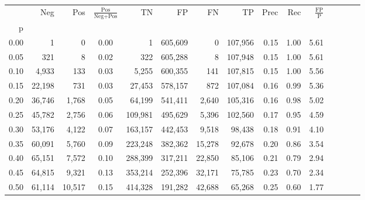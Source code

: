 \begin{tabular}{rrrcrrrrrrrrrrr}
\toprule
{} &     Neg &     Pos & $\frac{\text{Pos}}{\text{Neg}+\text{Pos}}$ &       TN &       FP &       FN &       TP &  Prec &   Rec & $\frac{\text{FP}}{\text{P}}$ \\
p    &         &         &                                            &          &          &          &          &       &       &                              \\
\midrule
0.00 &       1 &       0 &                                       0.00 &        1 &  605,609 &        0 &  107,956 &  0.15 &  1.00 &                         5.61 \\
0.05 &     321 &       8 &                                       0.02 &      322 &  605,288 &        8 &  107,948 &  0.15 &  1.00 &                         5.61 \\
0.10 &   4,933 &     133 &                                       0.03 &    5,255 &  600,355 &      141 &  107,815 &  0.15 &  1.00 &                         5.56 \\
0.15 &  22,198 &     731 &                                       0.03 &   27,453 &  578,157 &      872 &  107,084 &  0.16 &  0.99 &                         5.36 \\
0.20 &  36,746 &   1,768 &                                       0.05 &   64,199 &  541,411 &    2,640 &  105,316 &  0.16 &  0.98 &                         5.02 \\
0.25 &  45,782 &   2,756 &                                       0.06 &  109,981 &  495,629 &    5,396 &  102,560 &  0.17 &  0.95 &                         4.59 \\
0.30 &  53,176 &   4,122 &                                       0.07 &  163,157 &  442,453 &    9,518 &   98,438 &  0.18 &  0.91 &                         4.10 \\
0.35 &  60,091 &   5,760 &                                       0.09 &  223,248 &  382,362 &   15,278 &   92,678 &  0.20 &  0.86 &                         3.54 \\
0.40 &  65,151 &   7,572 &                                       0.10 &  288,399 &  317,211 &   22,850 &   85,106 &  0.21 &  0.79 &                         2.94 \\
0.45 &  64,815 &   9,321 &                                       0.13 &  353,214 &  252,396 &   32,171 &   75,785 &  0.23 &  0.70 &                         2.34 \\
0.50 &  61,114 &  10,517 &                                       0.15 &  414,328 &  191,282 &   42,688 &   65,268 &  0.25 &  0.60 &                         1.77 \\

\end{tabular}
